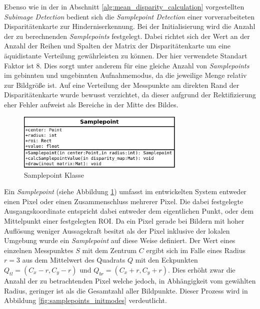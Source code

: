 \noindent
Ebenso wie in der in Abschnitt \ref{alg:mean_disparity_calculation} vorgestellten \emph{Subimage Detection} bedient sich die \emph{Samplepoint Detection} einer vorverarbeiteten Disparitätenkarte zur Hinderniserkennung. Bei der Initialisierung wird die Anzahl der zu berechnenden \emph{Samplepoints} festgelegt. Dabei richtet sich der Wert an der Anzahl der Reihen und Spalten der Matrix der Disparitätenkarte um eine äquidistante Verteilung gewährleisten zu können. Der hier verwendete Standart Faktor ist 8. Dies sorgt unter anderem für eine gleiche Anzahl von \emph{Samplepoints} im gebinnten und ungebinnten Aufnahmemodus, da die jeweilige Menge relativ zur Bildgröße ist. Auf eine Verteilung der Messpunkte am direkten Rand der Disparitätenkarte wurde bewusst verzichtet, da dieser aufgrund der Rektifizierung eher Fehler aufweist als Bereiche in der Mitte des Bildes.\\

\begin{figure}[h]
	\centering
	\includegraphics[width=8cm]{img/samplepoint_class}
	\caption{Samplepoint Klasse}
	\label{fig:samplepoint_class}
\end{figure}

\noindent
Ein \emph{Samplepoint} (siehe Abbildung \ref{fig:samplepoint_class}) umfasst im entwickelten System entweder einen Pixel oder einen Zusammenschluss mehrerer Pixel. Die dabei festgelegte Ausgangskoordinate entspricht dabei entweder dem eigentlichen Punkt, oder dem Mittelpunkt einer festgelegten ROI. Da ein Pixel gerade bei Bildern mit hoher Auflösung weniger Aussagekraft besitzt als der Pixel inklusive der lokalen Umgebung wurde ein \emph{Samplepoint} auf diese Weise definiert. Der Wert eines einzelnen Messpunktes $S$ mit dem Zentrum $C$ ergibt sich im Falle eines Radius $r=3$ aus dem Mittelwert des Quadrats $Q$ mit den Eckpunkten $Q_{tl} = (C_x - r, C_y -r)$ und $Q_{br} = (C_x + r, C_y +r)$. Dies erhöht zwar die Anzahl der zu betrachtenden Pixel welche jedoch, in Abhängigkeit vom gewählten Radius, geringer ist als die Gesamtzahl aller Bildpunkte. Dieser Prozess wird in Abbildung \ref{fig:samplepoints_initmodes} verdeutlicht.\\


